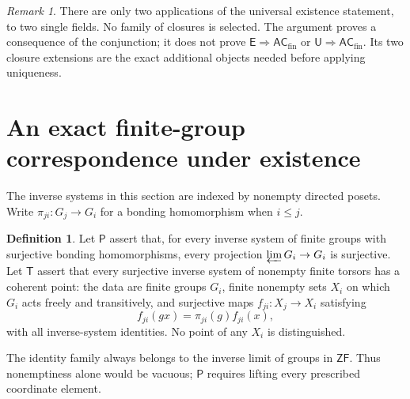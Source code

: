 \documentclass[11pt,a4paper]{article}
\theoremstyle{definition}\newtheorem{definition}[theorem]{Definition}
\theoremstyle{remark}\newtheorem{remark}[theorem]{Remark}
\newcommand{\ZF}{\mathsf{ZF}}\newcommand{\ZFA}{\mathsf{ZFA}}
\newcommand{\E}{\mathsf E}\newcommand{\U}{\mathsf U}
\newcommand{\ACfin}{\mathsf{AC}_{\mathrm{fin}}}
\begin{document}
\begin{remark}
There are only two applications of the universal existence statement, to two single fields. No family of closures is selected. The argument proves a consequence of the conjunction; it does not prove $\E\Rightarrow\ACfin$ or $\U\Rightarrow\ACfin$. Its two closure extensions are the exact additional objects needed before applying uniqueness.
\end{remark}

\section{An exact finite-group correspondence under existence}\label{sec:finitegroups}
The inverse systems in this section are indexed by nonempty directed posets. Write $\pi_{ji}:G_j\to G_i$ for a bonding homomorphism when $i\leq j$.

\begin{definition}
Let $\mathsf P$ assert that, for every inverse system of finite groups with surjective bonding homomorphisms, every projection $\varprojlim G_i\to G_i$ is surjective. Let $\mathsf T$ assert that every surjective inverse system of nonempty finite torsors has a coherent point: the data are finite groups $G_i$, finite nonempty sets $X_i$ on which $G_i$ acts freely and transitively, and surjective maps $f_{ji}:X_j\to X_i$ satisfying
\[
f_{ji}(g x)=\pi_{ji}(g)f_{ji}(x),
\]
with all inverse-system identities. No point of any $X_i$ is distinguished.
\end{definition}
The identity family always belongs to the inverse limit of groups in $\ZF$. Thus nonemptiness alone would be vacuous; $\mathsf P$ requires lifting every prescribed coordinate element.
\end{document}
